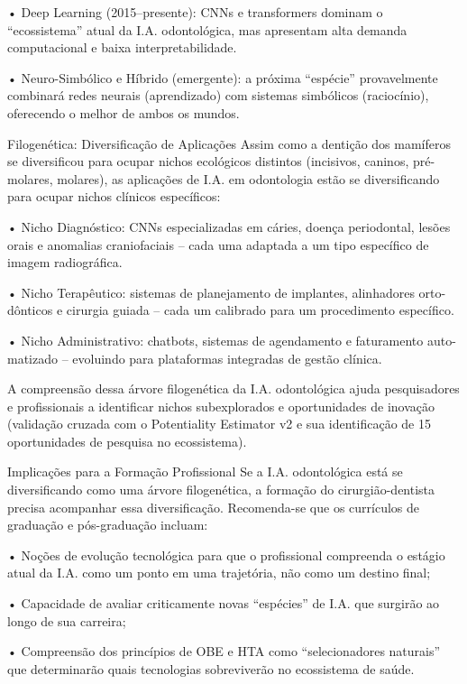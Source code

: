     • Deep Learning (2015–presente): CNNs e transformers dominam o “ecossistema”
      atual da I.A. odontológica, mas apresentam alta demanda computacional e baixa
      interpretabilidade.

    • Neuro-Simbólico e Híbrido (emergente): a próxima “espécie” provavelmente
      combinará redes neurais (aprendizado) com sistemas simbólicos (raciocínio),
      oferecendo o melhor de ambos os mundos.

Filogenética: Diversificação de Aplicações
Assim como a dentição dos mamíferos se diversificou para ocupar nichos ecológicos
distintos (incisivos, caninos, pré-molares, molares), as aplicações de I.A. em odontologia
estão se diversificando para ocupar nichos clínicos específicos:

    • Nicho Diagnóstico: CNNs especializadas em cáries, doença periodontal, lesões
      orais e anomalias craniofaciais – cada uma adaptada a um tipo específico de
      imagem radiográfica.

    • Nicho Terapêutico: sistemas de planejamento de implantes, alinhadores orto-
      dônticos e cirurgia guiada – cada um calibrado para um procedimento específico.

    • Nicho Administrativo: chatbots, sistemas de agendamento e faturamento auto-
      matizado – evoluindo para plataformas integradas de gestão clínica.

A compreensão dessa árvore filogenética da I.A. odontológica ajuda pesquisadores e
profissionais a identificar nichos subexplorados e oportunidades de inovação (validação
cruzada com o Potentiality Estimator v2 e sua identificação de 15 oportunidades de
pesquisa no ecossistema).

Implicações para a Formação Profissional
Se a I.A. odontológica está se diversificando como uma árvore filogenética, a formação
do cirurgião-dentista precisa acompanhar essa diversificação. Recomenda-se que os
currículos de graduação e pós-graduação incluam:

    • Noções de evolução tecnológica para que o profissional compreenda o estágio
      atual da I.A. como um ponto em uma trajetória, não como um destino final;

    • Capacidade de avaliar criticamente novas “espécies” de I.A. que surgirão ao longo
      de sua carreira;

    • Compreensão dos princípios de OBE e HTA como “selecionadores naturais” que
      determinarão quais tecnologias sobreviverão no ecossistema de saúde.

